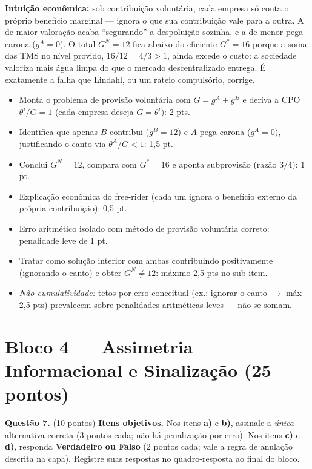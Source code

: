 \begin{solucao}
\textbf{Intui\c{c}\~ao econ\^omica:} sob contribui\c{c}\~ao volunt\'aria, cada empresa s\'o conta o pr\'oprio benef\'icio marginal --- ignora o que sua contribui\c{c}\~ao vale para a outra. A de maior valora\c{c}\~ao acaba ``segurando'' a despolui\c{c}\~ao sozinha, e a de menor pega carona ($g^A=0$). O total $G^N=12$ fica abaixo do eficiente $G^{*}=16$ porque a soma das TMS no n\'ivel provido, $16/12=4/3>1$, ainda excede o custo: a sociedade valoriza mais \'agua limpa do que o mercado descentralizado entrega. \'E exatamente a falha que Lindahl, ou um rateio compuls\'orio, corrige.
\rubricalabel
\begin{itemize}\item Monta o problema de provis\~ao volunt\'aria com $G=g^A+g^B$ e deriva a CPO $\theta^i/G=1$ (cada empresa deseja $G=\theta^i$): 2 pts.\item Identifica que apenas $B$ contribui ($g^B=12$) e $A$ pega carona ($g^A=0$), justificando o canto via $\theta^A/G<1$: 1{,}5 pt.\item Conclui $G^N=12$, compara com $G^{*}=16$ e aponta subprovis\~ao (raz\~ao $3/4$): 1 pt.\item Explica\c{c}\~ao econ\^omica do free-rider (cada um ignora o benef\'icio externo da pr\'opria contribui\c{c}\~ao): 0{,}5 pt.\item Erro aritm\'etico isolado com m\'etodo de provis\~ao volunt\'aria correto: penalidade leve de 1 pt.\item Tratar como solu\c{c}\~ao interior com ambas contribuindo positivamente (ignorando o canto) e obter $G^N\neq 12$: m\'aximo 2{,}5 pts no sub-item.\item \emph{N\~ao-cumulatividade:} tetos por erro conceitual (ex.: ignorar o canto $\to$ m\'ax 2{,}5 pts) prevalecem sobre penalidades aritm\'eticas leves --- n\~ao se somam.\end{itemize}
\end{solucao}



\section*{Bloco 4 --- Assimetria Informacional e Sinalização \hfill \normalsize (25 pontos)}

\textbf{Questão 7.} (10 pontos) \textbf{Itens objetivos.} Nos itens \textbf{a)} e \textbf{b)}, assinale a \emph{única} alternativa correta (3 pontos cada; não há penalização por erro). Nos itens \textbf{c)} e \textbf{d)}, responda \textbf{Verdadeiro ou Falso} (2 pontos cada; vale a regra de anulação descrita na capa). Registre suas respostas no quadro-resposta ao final do bloco.

